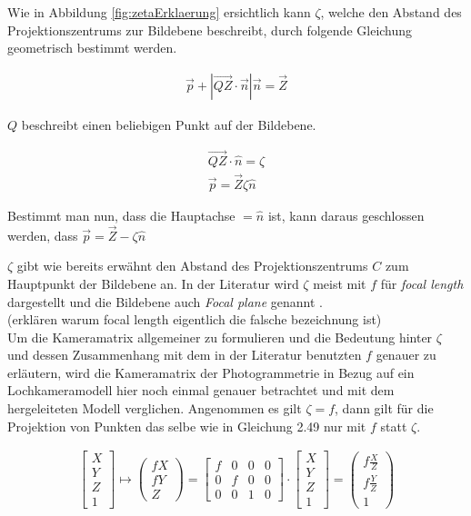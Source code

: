 Wie in Abbildung \ref{fig:zetaErklaerung} ersichtlich kann $\zeta$, welche den Abstand des Projektionszentrums zur Bildebene beschreibt, durch folgende Gleichung geometrisch bestimmt werden.

\begin{gather}
\vec{p}+|\vec{QZ} \cdot \vec{n}|\vec{n} = \vec{Z}
\end{gather}

$Q$ beschreibt einen beliebigen Punkt auf der Bildebene.

\begin{gather}
\vec{QZ} \cdot \hat{n} = \zeta\\
\vec{p}= \vec{Z}\zeta \hat{n}
\end{gather}

Bestimmt man nun, dass die Hauptachse $= \hat{n}$ ist, kann daraus geschlossen werden, dass $\vec{p} = \vec{Z} - \zeta \hat{n}$

$\zeta$ gibt wie bereits erwähnt den Abstand des Projektionszentrums $C$ zum Hauptpunkt der Bildebene an. 
In der Literatur  wird $\zeta$ meist mit $f$ für \textit{focal length} dargestellt und die Bildebene auch \textit{Focal plane} genannt \cite{HZ}.\\

(erklären warum focal length eigentlich die falsche bezeichnung ist)\\

Um die Kameramatrix allgemeiner zu formulieren und die Bedeutung hinter $\zeta$ und dessen Zusammenhang mit dem in der Literatur benutzten $f$ genauer zu erläutern, wird die Kameramatrix der Photogrammetrie in Bezug auf ein Lochkameramodell hier noch einmal genauer betrachtet und mit dem hergeleiteten Modell verglichen\cite{HZ,Heipke}. Angenommen es gilt $\zeta = f$, dann gilt für die Projektion von Punkten das selbe wie in Gleichung 2.49 nur mit $f$ statt $\zeta$. 

\begin{gather}
\begin{bmatrix}
X\\Y\\Z\\1
\end{bmatrix} \mapsto
\begin{pmatrix}
f X\\ f Y\\ Z
\end{pmatrix}
=
\begin{bmatrix}
f&0&0&0\\
0&f&0&0\\
0&0&1&0
\end{bmatrix}
\cdot
\begin{bmatrix}
X\\Y\\Z\\1
\end{bmatrix}
=
\begin{pmatrix}
f \frac{X}{Z}\\ f \frac{Y}{Z}\\1
\end{pmatrix}
\end{gather}

